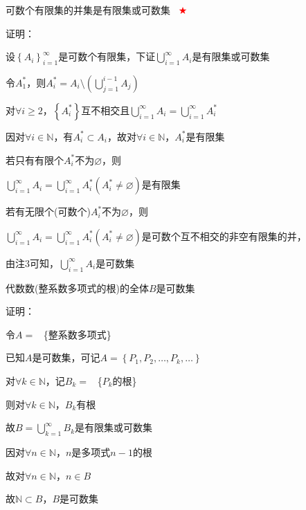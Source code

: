 \begin{wa}
可数个有限集的并集是有限集或可数集 \ \textcolor{red}{$\bigstar$}    
\end{wa}
\noindent 证明：
\par 设$\left\{A_{i}\right\} _{i=1}^{\infty}$是可数个有限集，下证$\bigcup \limits_{i=1}^{\infty}A_{i}$是有限集或可数集
\par 令$A_{1}^{*}$，则$A_{i}^{*} = A_{i} \setminus \left(\bigcup \limits_{j=1}^{i-1}A_{j}\right) $
\par 对$\forall i \geqslant 2$，$\left\{A_{i}^{*}\right\}$互不相交且$\bigcup \limits_{i=1}^{\infty}A_{i} = \bigcup \limits_{i=1}^{\infty}A_{i}^{*}$
\par 因对$\forall i \in \mathbb{N}$，有$A_{i}^{*} \subset A_{i}$，故对$\forall i \in \mathbb{N}$，$A_{i}^{*}$是有限集
\par {}若只有有限个$A_{i}^{*}$不为$\varnothing$，则
\par \quad $\bigcup \limits_{i=1}^{\infty}A_{i} = \bigcup \limits_{i=1}^{\infty}A_{i}^{*}(A_{i}^{*} \neq \varnothing)$是有限集
\par {}若有无限个(可数个)$A_{i}^{*}$不为$\varnothing$，则
\par \quad $\bigcup \limits_{i=1}^{\infty}A_{i} = \bigcup \limits_{i=1}^{\infty}A_{i}^{*}(A_{i}^{*} \neq \varnothing)$是可数个互不相交的非空有限集的并，
\par \quad  由注3可知，$\bigcup \limits_{i=1}^{\infty}A_{i}$是可数集

\begin{td}
代数数(整系数多项式的根)的全体$B$是可数集    
\end{td}
\noindent 证明：
\par 令$A = $ \ \{整系数多项式\}  
\par 已知$A$是可数集，可记$A = \left\{P_{1},P_{2},\dots,P_{k},\dots\right\} $
\par 对$\forall k \in \mathbb{N}$，记$B_{k} = $ \ \{$P_{k}$的根\}  
\par 则对$\forall k \in \mathbb{N}$，$B_{k}$有根
\par 故$B = \bigcup \limits_{k=1}^{\infty}B_{k}$是有限集或可数集
\par 因对$\forall n \in \mathbb{N}$，$n$是多项式$n-1$的根
\par 故对$\forall n \in \mathbb{N}$，$n \in B$
\par 故$\mathbb{N} \subset B$，$B$是可数集